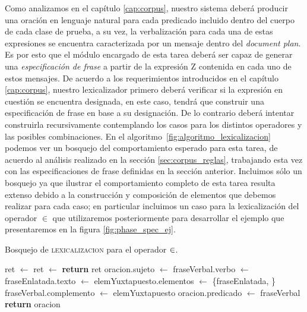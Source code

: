 Como analizamos en el capítulo \ref{cap:corpus}, nuestro sistema deberá producir una oración en lenguaje natural para cada predicado incluido dentro del cuerpo de cada clase de prueba, a su vez, la verbalización para cada una de estas expresiones se encuentra caracterizada por un mensaje dentro del \textit{document plan}. Es por esto que el módulo encargado de esta tarea deberá ser capaz de generar una \emph{especificación de frase} a partir de la expresión Z contenida en cada uno de estos mensajes. De acuerdo a los requerimientos introducidos en el capítulo \ref{cap:corpus}, nuestro lexicalizador primero deberá verificar si la expresión en cuestión se encuentra designada, en este caso, tendrá que construir una especificación de frase en base a su designación. De lo contrario deberá intentar construirla recursivamente contemplando los casos para los distintos operadores y las posibles combinaciones. En el algoritmo~\ref{fig:algoritmo_lexicalizacion} podemos ver un bosquejo del comportamiento esperado para esta tarea, de acuerdo al análisis realizado en la sección \ref{sec:corpus_reglas}, trabajando esta vez con las especificaciones de frase definidas en la sección anterior. Incluimos sólo un bosquejo ya que ilustrar el comportamiento completo de esta tarea resulta extenso debido a la construcción y composición de elementos que debemos realizar para cada caso; en particular incluimos un caso para la lexicalización del operador $\in$ que utilizaremos posteriormente para desarrollar el ejemplo que presentaremos en la figura \ref{fig:phase_spec_ej}.

\begin{algorithm}[H]
\caption{Bosquejo de \textsc{lexicalizacion} para el operador $\protect\in$.}\label{fig:algoritmo_lexicalizacion}
\begin{algorithmic}[1]
\State ret $\gets$ 
\Else
\State ret $\gets$ 
\EndIf
\State \textbf{return} ret
\EndFunction
\Statex
{}
\State oracion.sujeto $\gets$ 
\State fraseVerbal.verbo $\gets$ 
\State fraseEnlatada.texto $\gets$ 
\State elemYuxtapuesto.elementos $\gets$ \{fraseEnlatada, \}
\State fraseVerbal.complemento $\gets$ elemYuxtapuesto
\State oracion.predicado $\gets$ fraseVerbal
\State \textbf{return} oracion
\EndFunction
\end{algorithmic}
\end{algorithm}

